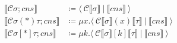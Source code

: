 \documentclass[11pt]{article}
\newcommand{\translate}[1]{\llbracket #1 \rrbracket}
\newcommand{\C}{\mathcal{C}}
\newcommand{\cut}[2]{\langle\ #1\ |\ #2\ \rangle}
\begin{document}
\begin{align*}
  \translate{\C\sigma;cns} &\coloneqq \cut{\C\translate{\sigma}}{\translate{cns}} \\
  \translate{\C\sigma(*)\tau;cns} &\coloneqq \mu x.\cut{\C\translate{\sigma}(x)\translate{\tau}}{\translate{cns}} \\
  \translate{\C\sigma[*]\tau;cns} &\coloneqq \mu k.\cut{\C\translate{\sigma}[k]\translate{\tau}}{\translate{cns}} \\
\end{align*}
\end{document}
